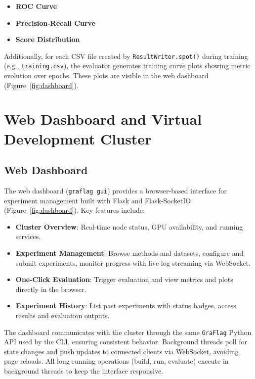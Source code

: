 \documentclass[twoside,11pt]{article}
\begin{document}
\begin{itemize}[nosep,leftmargin=*]
\item \textbf{ROC Curve}
\item \textbf{Precision-Recall Curve}
\item \textbf{Score Distribution}
\end{itemize}

Additionally, for each CSV file created by \texttt{ResultWriter.spot()} during training (e.g., \texttt{training.csv}), the evaluator generates training curve plots showing metric evolution over epochs. These plots are visible in the web dashboard (Figure~\ref{fig:dashboard}).

\section{Web Dashboard and Virtual Development Cluster}
\label{app:dashboard}

\subsection{Web Dashboard}

The web dashboard (\texttt{graflag gui}) provides a browser-based interface for experiment management built with Flask and Flask-SocketIO (Figure~\ref{fig:dashboard}). Key features include:

\begin{itemize}[nosep,leftmargin=*]
\item \textbf{Cluster Overview}: Real-time node status, GPU availability, and running services.
\item \textbf{Experiment Management}: Browse methods and datasets, configure and submit experiments, monitor progress with live log streaming via WebSocket.
\item \textbf{One-Click Evaluation}: Trigger evaluation and view metrics and plots directly in the browser.
\item \textbf{Experiment History}: List past experiments with status badges, access results and evaluation outputs.
\end{itemize}

The dashboard communicates with the cluster through the same \texttt{GraFlag} Python API used by the CLI, ensuring consistent behavior. Background threads poll for state changes and push updates to connected clients via WebSocket, avoiding page reloads. All long-running operations (build, run, evaluate) execute in background threads to keep the interface responsive.
\end{document}
